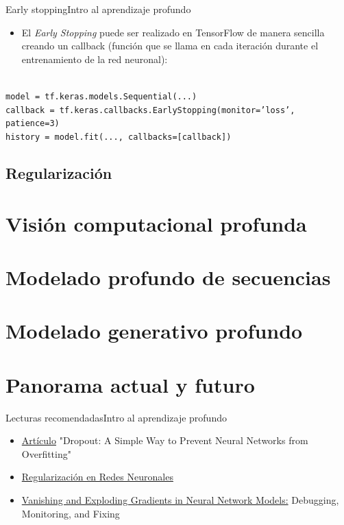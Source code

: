 \documentclass[10pt,border=3pt,tikz]{beamer}
\begin{document}
    \begin{frame}{Early stopping}{Intro al aprendizaje profundo}
        \begin{itemize}
            \item El \textit{Early Stopping} puede ser realizado en TensorFlow de manera sencilla creando un callback (función que se llama en cada iteración durante el entrenamiento de la red neuronal):\\
        \end{itemize}
        
        \texttt{\\model = tf.keras.models.Sequential(...)}\\
        \texttt{callback = tf.keras.callbacks.EarlyStopping(monitor='loss', patience=3)}\\
        \texttt{history = model.fit(..., callbacks=[callback])}
    \end{frame}
    
    \subsection{Regularización}
    \section{Visión computacional profunda}
    \section{Modelado profundo de secuencias}
    \section{Modelado generativo profundo}
    \section{Panorama actual y futuro}
    
    \begin{frame}{Lecturas recomendadas}{Intro al aprendizaje profundo}
        \begin{itemize}
            \item \colorbox{blue!10}{\href{https://jmlr.org/papers/v15/srivastava14a.html}{Artículo}} "Dropout: A Simple Way to Prevent Neural Networks from Overfitting"
            \item \colorbox{blue!10}{\href{https://www.pinecone.io/learn/regularization-in-neural-networks/}{Regularización en Redes Neuronales}}
            \item \colorbox{blue!10}{\href{https://neptune.ai/blog/vanishing-and-exploding-gradients-debugging-monitoring-fixing}{Vanishing and Exploding Gradients in Neural Network Models:}} Debugging, Monitoring, and Fixing
        \end{itemize}
    \end{frame}

	
\end{document}
